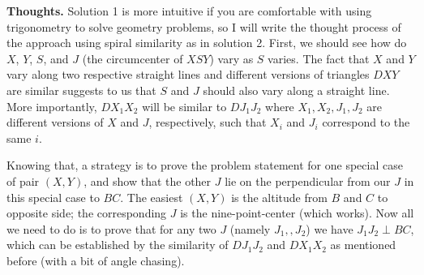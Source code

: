 \documentclass[11pt,a4paper]{article}
\begin{document}
\begin{itemize}
\textbf{Thoughts.} Solution 1 is more intuitive if you are comfortable with using trigonometry to solve geometry problems, so I will write the thought process of the approach using spiral similarity as in solution 2. First, we should see how do $X$, $Y$, $S$, and $J$ (the circumcenter of $XSY$) vary as $S$ varies. The fact that $X$ and $Y$ vary along two respective straight lines and different versions of triangles $DXY$ are similar suggests to us that $S$ and $J$ should also vary along a straight line. More importantly, $DX_1X_2$ will be similar to $DJ_1J_2$ where $X_1, X_2, J_1, J_2$ are different versions of $X$ and $J$, respectively, such that $X_i$ and $J_i$ correspond to the same $i$. 

Knowing that, a strategy is to prove the problem statement for one special case of pair $(X, Y)$, and show that the other $J$ lie on the perpendicular from our $J$ in this special case to $BC$. The easiest $(X, Y)$ is the altitude from $B$ and $C$ to opposite side; the corresponding $J$ is the nine-point-center (which works). Now all we need to do is to prove that for any two $J$ (namely $J_1,, J_2$) we have $J_1J_2\perp BC$, which can be established by the similarity of $DJ_1J_2$ and $DX_1X_2$ as mentioned before (with a bit of angle chasing). 


\end{itemize}
\end{document}
